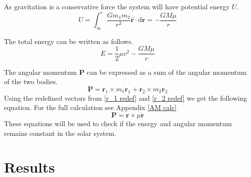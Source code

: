 \documentclass[reprint,english,notitlepage]{revtex4-2}
\begin{document}
As gravitation is a conservative force the system will have potential energy $ U $. 
\[
U = ∫ _{\infty} ^{r} \frac{Gm_1 m_2}{r^{2}}\mathbf{\hat{r}} ⋅ \mathrm{d}\mathbf{r} = - \frac{GM \mu}{r}
\] 

The total energy can be written as follows. 
\[
E = \frac{1}{2}μ v^{2}  - \frac{GM\mu}{r}
\]

The angular momentum $ \mathbf{P} $ can be expressed as a sum of the angular momentum of the two bodies. 
\[
\mathbf{P} = \mathbf{r}_1 \times m_1 \mathbf{\dot{r}}_1 + \mathbf{r}_2 \times m_2 \mathbf{\dot{r}}_2
\]
Using the redefined vectors from \ref{r_1 redef} and \ref{r_2 redef}  we get the following equation. For the full calculation see Appendix \ref{AM calc}
\[
\mathbf{P} = \mathbf{r} \times \mu \mathbf{\dot{r}}
\]
These equations will be used to check if the energy and angular momentum remains constant in the solar system. 

\section{Results}
\end{document}
